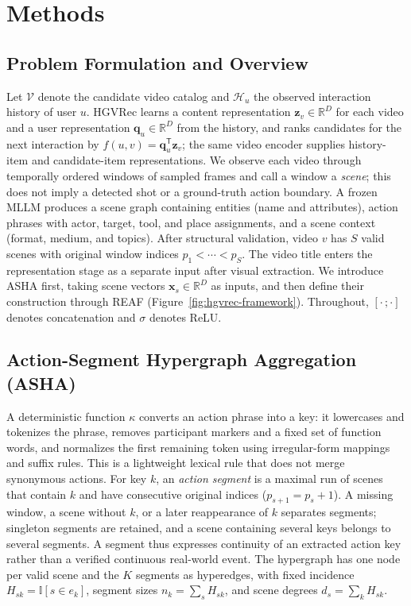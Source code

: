 \section{Methods}
\label{sec:methods}

\subsection{Problem Formulation and Overview}
\label{sec:formulation}
Let $\mathcal{V}$ denote the candidate video catalog and $\mathcal{H}_u$ the observed interaction history of user $u$.
HGVRec learns a content representation $\mathbf{z}_v\in\mathbb{R}^{D}$ for each video and a user representation $\mathbf{q}_u\in\mathbb{R}^{D}$ from the history, and ranks candidates for the next interaction by $f(u,v)=\mathbf{q}_u^{\mathsf T}\mathbf{z}_v$; the same video encoder supplies history-item and candidate-item representations.
We observe each video through temporally ordered windows of sampled frames and call a window a \emph{scene}; this does not imply a detected shot or a ground-truth action boundary.
A frozen MLLM produces a scene graph containing entities (name and attributes), action phrases with actor, target, tool, and place assignments, and a scene context (format, medium, and topics).
After structural validation, video $v$ has $S$ valid scenes with original window indices $p_1<\cdots<p_S$.
The video title enters the representation stage as a separate input after visual extraction.
We introduce ASHA first, taking scene vectors $\mathbf{x}_s\in\mathbb{R}^{D}$ as inputs, and then define their construction through REAF (Figure~\ref{fig:hgvrec-framework}).
Throughout, $[\cdot\,;\cdot]$ denotes concatenation and $\sigma$ denotes ReLU.

\subsection{Action-Segment Hypergraph Aggregation (ASHA)}
\label{sec:asha}
A deterministic function $\kappa$ converts an action phrase into a key: it lowercases and tokenizes the phrase, removes participant markers and a fixed set of function words, and normalizes the first remaining token using irregular-form mappings and suffix rules.
This is a lightweight lexical rule that does not merge synonymous actions.
For key $k$, an \emph{action segment} is a maximal run of scenes that contain $k$ and have consecutive original indices ($p_{s+1}=p_s+1$).
A missing window, a scene without $k$, or a later reappearance of $k$ separates segments; singleton segments are retained, and a scene containing several keys belongs to several segments.
A segment thus expresses continuity of an extracted action key rather than a verified continuous real-world event.
The hypergraph has one node per valid scene and the $K$ segments as hyperedges, with fixed incidence $H_{sk}=\mathbb{I}[s\in e_k]$, segment sizes $n_k=\sum_sH_{sk}$, and scene degrees $d_s=\sum_kH_{sk}$.

